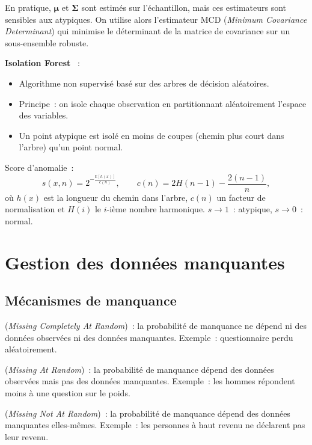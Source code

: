 \documentclass[a4paper,11pt]{article}
\theoremstyle{definition}
\theoremstyle{remark}
\begin{document}
En pratique, $\boldsymbol{\mu}$ et $\boldsymbol{\Sigma}$ sont estimés
sur l'échantillon, mais ces estimateurs sont sensibles aux atypiques.
On utilise alors l'estimateur MCD (\textit{Minimum Covariance
Determinant}) qui minimise le déterminant de la matrice de covariance
sur un sous-ensemble robuste.

\textbf{Isolation Forest}~\cite{liu2008isolation} :
\begin{itemize}
  \item Algorithme non supervisé basé sur des arbres de décision aléatoires.
  \item Principe~: on isole chaque observation en partitionnant
    aléatoirement l'espace des variables.
  \item Un point atypique est isolé en moins de coupes (chemin plus court
    dans l'arbre) qu'un point normal.
\end{itemize}
Score d'anomalie~:
\[
s(x, n) = 2^{-\frac{\mathbb{E}[h(x)]}{c(n)}}, \qquad
c(n) = 2H(n-1) - \frac{2(n-1)}{n},
\]
où $h(x)$ est la longueur du chemin dans l'arbre, $c(n)$ un facteur de
normalisation et $H(i)$ le $i$-ième nombre harmonique.
$s \to 1$~: atypique, $s \to 0$~: normal.

\section{Gestion des données manquantes}

\subsection{Mécanismes de manquance}

\begin{description}[style=nextline]
  \item[MCAR] (\textit{Missing Completely At Random})~: la probabilité
    de manquance ne dépend ni des données observées ni des données
    manquantes. Exemple~: questionnaire perdu aléatoirement.
  \item[MAR] (\textit{Missing At Random})~: la probabilité de manquance
    dépend des données observées mais pas des données manquantes.
    Exemple~: les hommes répondent moins à une question sur le poids.
  \item[MNAR] (\textit{Missing Not At Random})~: la probabilité de
    manquance dépend des données manquantes elles-mêmes.
    Exemple~: les personnes à haut revenu ne déclarent pas leur revenu.
\end{description}
\end{document}

